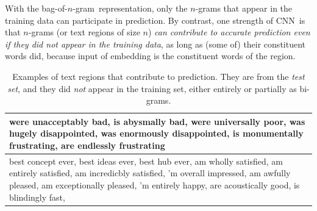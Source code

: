 \documentclass[11pt,letterpaper]{article}
\newcommand{\cnn}{CNN}
\newcommand{\scnn}{seq-CNN}
\newcommand{\bongram}{bag-of-$n$-gram}
\newcommand{\Elec}{Elec}
\begin{document}
With the \bongram\ representation, 
only the $n$-grams that 
appear in the training data can participate in prediction. 
By contrast, 
one strength of \cnn\ is that $n$-grams (or text regions of size $n$) 
{\em can contribute to accurate prediction even if they did not appear in the training data}, 
as long as (some of) their constituent words did, 
because input of embedding is the constituent words of the region.   
%
\begin{table}
\begin{center}
\begin{footnotesize}
\begin{tabular}{|p{2.9in}|} 
\hline
{\small 
were unacceptably bad, is abysmally bad,  %
were universally poor, %
was hugely disappointed, was enormously disappointed, 
is monumentally frustrating,  are endlessly frustrating
}\\
\hline
{\small 
best concept ever, best ideas ever, best hub ever, %
am wholly satisfied, 
am entirely satisfied, am incredicbly satisfied, 
'm overall impressed, am awfully pleased, 
am exceptionally pleased, 'm entirely happy, 
are acoustically good, is blindingly fast, 
}\\
\hline
\end{tabular}
\end{footnotesize}
\vspace{-0.1in}
\caption{ \label{tab:bv-tstonly} \small
Examples of text regions that contribute to prediction. 
They are from the {\em test set}, and they 
did {\em not} appear in the training set, either entirely or partially as bi-grams.  
}
\end{center}
\end{table}
\end{document}

